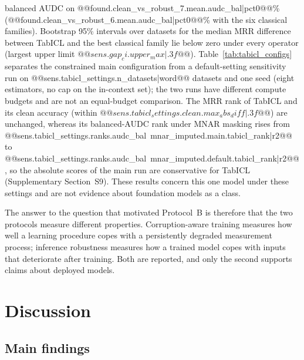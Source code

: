 \documentclass[pdflatex,sn-mathphys]{sn-jnl}
\theoremstyle{thmstyleone}
\theoremstyle{thmstyletwo}
\theoremstyle{thmstylethree}
\begin{document}
balanced AUDC on @@{found.clean_vs_robust_7.mean.audc_bal|pct0}@@\% (@@{found.clean_vs_robust_6.mean.audc_bal|pct0}@@\% with the six classical families). Bootstrap 95\% intervals over datasets for the median MRR difference between TabICL and the best classical family lie below zero under every operator (largest upper limit $@@{sens.gap_ci.upper_max|.3f}@@$). Table~\ref{tab:tabicl_configs} separates the constrained main configuration from a default-setting sensitivity run on @@{sens.tabicl_settings.n_datasets|word}@@ datasets and one seed (eight estimators, no cap on the in-context set); the two runs have different compute budgets and are not an equal-budget comparison. The MRR rank of TabICL and its clean accuracy (within $@@{sens.tabicl_settings.clean.max_abs_diff|.3f}@@$) are unchanged, whereas its balanced-AUDC rank under MNAR masking rises from @@{sens.tabicl_settings.ranks.audc_bal~mnar_imputed.main.tabicl_rank|r2}@@ to @@{sens.tabicl_settings.ranks.audc_bal~mnar_imputed.default.tabicl_rank|r2}@@, so the absolute scores of the main run are conservative for TabICL (Supplementary Section~S9). These results concern this one model under these settings and are not evidence about foundation models as a class.





The answer to the question that motivated Protocol~B is therefore that the two protocols measure different properties. Corruption-aware training measures how well a learning procedure copes with a persistently degraded measurement process; inference robustness measures how a trained model copes with inputs that deteriorate after training. Both are reported, and only the second supports claims about deployed models.


\section{Discussion}\label{sec:discussion}

\subsection{Main findings}\label{sec:disc:findings}
\end{document}
